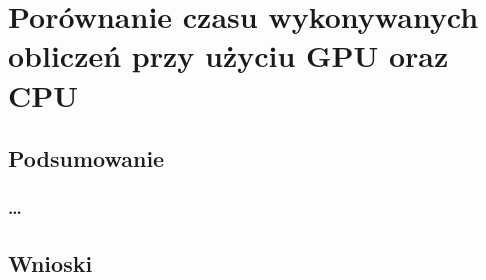 \chapter{Porównanie czasu wykonywanych obliczeń przy użyciu GPU oraz CPU}
\label{t:int}

\section{Podsumowanie}
\label{t:int:stateofart}

	\subsection{\dots}

\section{Wnioski}